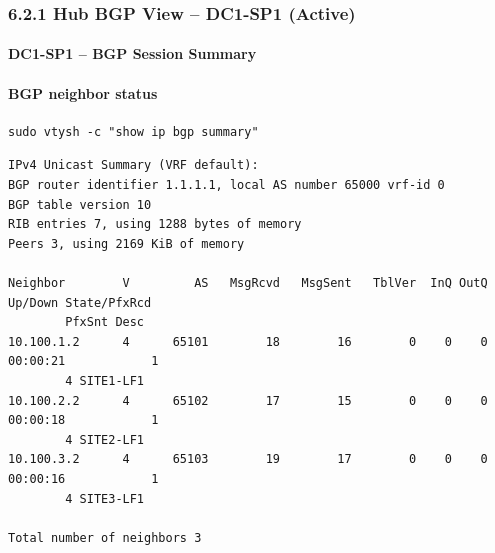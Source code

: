 \documentclass[11pt]{article}
\begin{document}
%
%
%
\subsubsection{6.2.1 Hub BGP View -- DC1-SP1 (Active)}
\label{sec:bgp-overlay-hub-dc1-sp1}

\paragraph{DC1-SP1 -- BGP Session Summary}

\paragraph{BGP neighbor status}

\begin{verbatim}
sudo vtysh -c "show ip bgp summary"
\end{verbatim}

\begin{verbatim}
IPv4 Unicast Summary (VRF default):
BGP router identifier 1.1.1.1, local AS number 65000 vrf-id 0
BGP table version 10
RIB entries 7, using 1288 bytes of memory
Peers 3, using 2169 KiB of memory

Neighbor        V         AS   MsgRcvd   MsgSent   TblVer  InQ OutQ  Up/Down State/PfxRcd   
        PfxSnt Desc
10.100.1.2      4      65101        18        16        0    0    0 00:00:21            1
        4 SITE1-LF1
10.100.2.2      4      65102        17        15        0    0    0 00:00:18            1
        4 SITE2-LF1
10.100.3.2      4      65103        19        17        0    0    0 00:00:16            1
        4 SITE3-LF1

Total number of neighbors 3
\end{verbatim}
\end{document}
